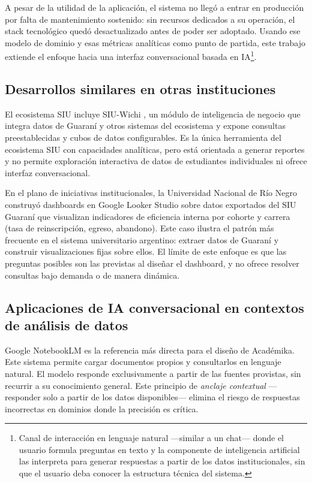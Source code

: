 \documentclass[
  spanish,
]{article}
\begin{document}
A pesar de la utilidad de la aplicación, el sistema no llegó a entrar en producción
por falta de mantenimiento sostenido: sin recursos dedicados a su operación,
el stack tecnológico quedó desactualizado antes de poder ser adoptado.
Usando ese modelo de dominio y esas métricas analíticas como punto de partida,
este trabajo extiende el enfoque hacia una interfaz conversacional basada en IA\footnote{Canal de interacción en lenguaje natural
---similar a un chat--- donde el usuario formula preguntas en texto y
la componente de inteligencia artificial las interpreta para generar respuestas
a partir de los datos institucionales, sin que el usuario deba conocer
la estructura técnica del sistema.}.


\subsection{Desarrollos similares en otras instituciones}\label{desarrollos-similares-en-otras-instituciones}

El ecosistema SIU incluye SIU-Wichi \citep{siu2024wichi},
un módulo de inteligencia de negocio que integra datos de Guaraní y otros
sistemas del ecosistema y expone consultas preestablecidas y cubos de datos
configurables. Es la única herramienta del ecosistema SIU con capacidades analíticas,
pero está orientada a generar reportes y no permite exploración
interactiva de datos de estudiantes individuales ni ofrece interfaz conversacional.

En el plano de iniciativas institucionales, la Universidad Nacional de Río Negro
construyó dashboards en Google Looker Studio sobre datos exportados del SIU
Guaraní \citep{unrn2024estadisticas} que visualizan indicadores de eficiencia
interna por cohorte y carrera (tasa de reinscripción, egreso, abandono). Este caso
ilustra el patrón más frecuente en el sistema universitario argentino: extraer datos
de Guaraní y construir visualizaciones fijas sobre ellos. El límite de este enfoque
es que las preguntas posibles son las previstas al diseñar el dashboard,
y no ofrece resolver consultas bajo demanda o de manera dinámica.

\subsection{Aplicaciones de IA conversacional en contextos de análisis de
datos}\label{aplicaciones-de-ia-conversacional-en-contextos-de-anuxe1lisis-de-datos}

Google NotebookLM es la referencia más directa para el diseño de Académika.
Este sistema permite cargar documentos propios y consultarlos en lenguaje natural.
El modelo responde exclusivamente a partir de las fuentes provistas, sin recurrir
a su conocimiento general. Este principio de \emph{anclaje contextual}
---responder solo a partir de los datos disponibles--- elimina el riesgo de
respuestas incorrectas en dominios donde la precisión es crítica.
\end{document}
